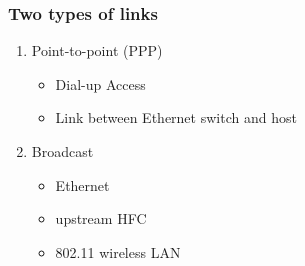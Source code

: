 \documentclass[a4paper]{article}
\begin{document}
\subsubsection{Two types of links}
\begin{enumerate}
    \item Point-to-point (PPP)
    \begin{itemize}[label=$\circ$]
        \item Dial-up Access
        \item Link between Ethernet switch and host
    \end{itemize}
    \item Broadcast
    \begin{itemize}[label=$\circ$]
        \item Ethernet
        \item upstream HFC
        \item 802.11 wireless LAN
    \end{itemize}
\end{enumerate}
\end{document}
